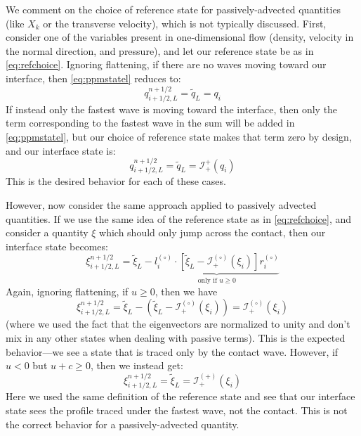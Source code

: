 \documentclass[iop]{../emulateapj}
\newcommand{\evz}{{(\circ)}}
\newcommand{\evp}{{(+)}}
\begin{document}
We comment on the choice of reference state for passively-advected
quantities (like $X_k$ or the transverse velocity), which is not typically 
discussed. First, consider one of the variables present in one-dimensional flow
(density, velocity in the normal direction, and pressure), and let our 
reference state be as in \autoref{eq:refchoice}.
Ignoring flattening, if there are no waves moving toward our
interface, then \autoref{eq:ppmstatel} reduces to:
\begin{equation}
q_{i+1/2,L}^{n+1/2} = \tilde{q}_L = q_i
\end{equation}
If instead only the fastest wave is moving toward the interface, then
only the term corresponding to the fastest wave in the sum will be
added in \autoref{eq:ppmstatel}, but our choice of reference state makes
that term zero by design, and our interface state is:
\begin{equation}
q_{i+1/2,L}^{n+1/2} = \tilde{q}_L = \mathcal{I}_+^{+}(q_i)
\end{equation}
This is the desired behavior for each of these cases. 

However, now consider the same approach applied to passively advected quantities.
If we use the same idea of the reference state as
in \autoref{eq:refchoice}, and consider a quantity $\xi$ which should only
jump across the contact, then our interface state becomes:
\begin{equation}
\xi_{i+1/2,L}^{n+1/2} = \tilde{\xi}_L -
  \underbrace{l_i^\evz \cdot \left [
        \tilde{\xi}_L  - \mathcal{I}^\evz_+(\xi_i)
       \right ] r_i^\evz}_{\text{only if~$u \ge 0$}}
\end{equation}
Again, ignoring flattening, if $u \ge 0$, then we have
\begin{equation}
\xi_{i+1/2,L}^{n+1/2} = \tilde{\xi}_L -
  \left (\tilde{\xi}_L  - \mathcal{I}^\evz_+(\xi_i) \right ) = \mathcal{I}^\evz_+(\xi_i)
\end{equation}
(where we used the fact that the eigenvectors are normalized to unity and
don't mix in any other states when dealing with passive terms).  This
is the expected behavior---we see a state that is traced only by the
contact wave.  However, if $u < 0$ but $u + c \ge 0$, then we instead get:
\begin{equation}
\xi_{i+1/2,L}^{n+1/2} = \tilde{\xi}_L = \mathcal{I}^\evp_+(\xi_i)
\end{equation}
Here we used the same definition of the reference state and see that our
interface state sees the profile traced under the fastest wave, not the
contact.  This is not the correct behavior for a passively-advected
quantity.  
\end{document}
